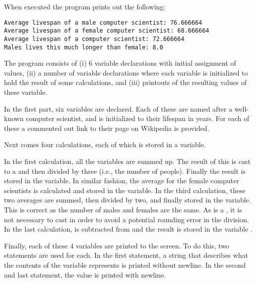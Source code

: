 When executed the program prints out the following:

\begin{verbatim}
Average livespan of a male computer scientist: 76.666664
Average livespan of a female computer scientist: 68.666664
Average livespan of a computer scientist: 72.666664
Males lives this much longer than female: 8.0
\end{verbatim}

The program consists of (i) 6 variable declarations with initial assignment of values, (ii) a number of variable declarations where each variable is initialized to hold the result of some calculations, and (iii) printouts of the resulting values of these variable.

In the first part, six  variables are declared. Each of these are named after a well-known computer scientist, and is initialized to their lifespan in years. For each of these a commented out link to their page on Wikipedia is provided.

Next comes four calculations, each of which is stored in a  variable.

In the first calculation, all the  variables are summed up. The result of this is cast to a  and then divided by three (i.e., the number of people). Finally the result is stored in the  variable. In similar fashion, the average for the female computer scientists is calculated and stored in the  variable. In the third calculation, these two averages are summed, then divided by two, and finally stored in the  variable. This is correct as the number of males and females are the same. As  is a , it is not necessary to cast in order to avoid a potential rounding error in the division. In the last calculation,  is subtracted from  and the result is stored in the variable .

Finally, each of these 4 variables are printed to the screen. To do this, two statements are used for each. In the first statement, a string that describes what the contents of the variable represents is printed without newline. In the second and last statement, the value is printed with newline.
